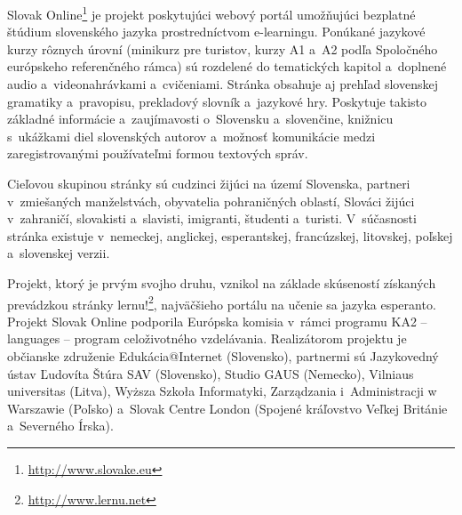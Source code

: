 Slovak Online\footnote{\url{http://www.slovake.eu}} je projekt poskytujúci webový portál umožňujúci bezplatné štúdium slovenského jazyka prostredníctvom e-learningu. Ponúkané jazykové kurzy rôznych úrovní (minikurz pre turistov, kurzy A1 a~A2 podľa Spoločného európskeho referenčného rámca) sú rozdelené do tematických kapitol a~doplnené audio a~videonahrávkami a~cvičeniami. Stránka obsahuje aj prehľad slovenskej gramatiky a~pravopisu, prekladový slovník a~jazykové hry. Poskytuje takisto základné informácie a~zaujímavosti o~Slovensku a~slovenčine, knižnicu s~ukážkami diel slovenských autorov a~možnosť komunikácie medzi zaregistrovanými používateľmi formou textových správ.

Cieľovou skupinou stránky sú cudzinci žijúci na území Slovenska, partneri v~zmiešaných manželstvách, obyvatelia pohraničných oblastí, Slováci žijúci v~zahraničí, slovakisti a~slavisti, imigranti, študenti a~turisti. V~súčasnosti stránka existuje v~nemeckej, anglickej, esperantskej, francúzskej, litovskej, poľskej a~slovenskej verzii.

Projekt, ktorý je prvým svojho druhu, vznikol na základe skúseností získaných prevádzkou stránky lernu!\footnote{\url{http://www.lernu.net}}, najväčšieho portálu na učenie sa jazyka esperanto. Projekt Slovak Online podporila Európska komisia v~rámci programu KA2 – languages – program celoživotného vzdelávania. Realizátorom projektu je občianske združenie Edukácia@Internet (Slovensko), partnermi sú Jazykovedný ústav Ľudovíta Štúra SAV (Slovensko), Studio GAUS (Nemecko), Vilniaus universitas (Litva), Wyższa Szkoła Informatyki, Zarządzania i~Administracji w Warszawie (Poľsko) a~Slovak Centre London (Spojené kráľovstvo Veľkej Británie a~Severného Írska).
